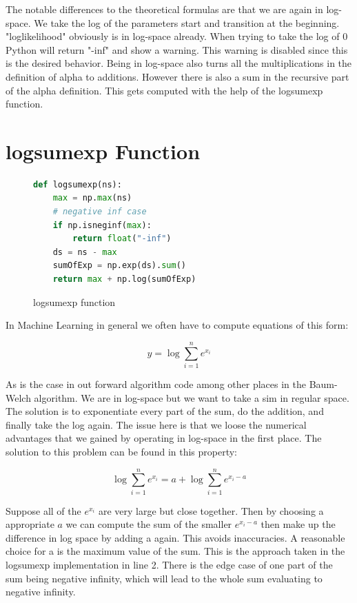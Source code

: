 The notable differences to the theoretical formulas are that we are again in log-space. We take the log of the parameters start and transition at the beginning. "loglikelihood" obviously is in log-space already. When trying to take the log of 0 Python will return "-inf" and show a warning. This warning is disabled since this is the desired behavior. Being in log-space also turns all the multiplications in the definition of alpha to additions. However there is also a sum in the recursive part of the alpha definition. This gets computed with the help of the logsumexp function. 

\section{logsumexp Function}

\begin{figure}
\begin{singlespace}
\begin{lstlisting}[language=Python]
def logsumexp(ns):
    max = np.max(ns)
    # negative inf case
    if np.isneginf(max):
        return float("-inf")
    ds = ns - max
    sumOfExp = np.exp(ds).sum()
    return max + np.log(sumOfExp)

\end{lstlisting}
\end{singlespace}
\caption{logsumexp function}    
\label{fig:logsumexp-listing}
\end{figure}

In Machine Learning in general we often have to compute equations of this form: 

\begin{equation}
y=\log \sum_{i=1}^{n} e^{x_{i}}
\end{equation}

As is the case in out forward algorithm code among other places in the Baum-Welch algorithm. We are in log-space but we want to take a sim in regular space. The solution is to exponentiate every part of the sum, do the addition, and finally take the log again. The issue here is that we loose the numerical advantages that we gained by operating in log-space in the first place. The solution to this problem can be found in this property:

\begin{equation}
\log \sum_{i=1}^{n} e^{x_{i}}=a+\log \sum_{i=1}^{n} e^{x_{i}-a}
\end{equation}

Suppose all of the $e^{x_i}$ are very large but close together. Then by choosing a appropriate $a$ we can compute the sum of the smaller $e^{x_i-a}$ then make up the difference in log space by adding a again. This avoids inaccuracies. A reasonable choice for a is the maximum value of the sum. This is the approach taken in the logsumexp implementation in line 2. There is the edge case of one part of the sum being negative infinity, which will lead to the whole sum evaluating to negative infinity. \parencite{mllecture}

